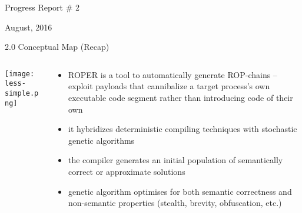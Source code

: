 \documentclass[9pt]{beamer}
\begin{document}


\begin{frame}
\begin{center}    
    {\huge Progress Report \# 2}
    \vspace{.3cm}
    
    {\large August, 2016}
    \end{center} 
    
\end{frame}

\begin{frame}{2.0 Conceptual Map (Recap)}

\begin{columns}

\begin{column}{0.5\textwidth}
\texttt{[image: less-simple.png]}

\end{column}
\begin{column}{.5\textwidth}

\begin{itemize}
\item ROPER is a tool to automatically generate ROP-chains -- exploit payloads that cannibalize a target process's own executable code segment rather than introducing code of their own
\item it hybridizes deterministic compiling techniques with stochastic genetic algorithms
\item the compiler generates an initial population of semantically correct or approximate solutions
\item genetic algorithm optimises for both semantic correctness and non-semantic properties (stealth, brevity, obfuscation, etc.)
\end{itemize}

\end{column}

\end{columns}

\end{frame}
\end{document}
